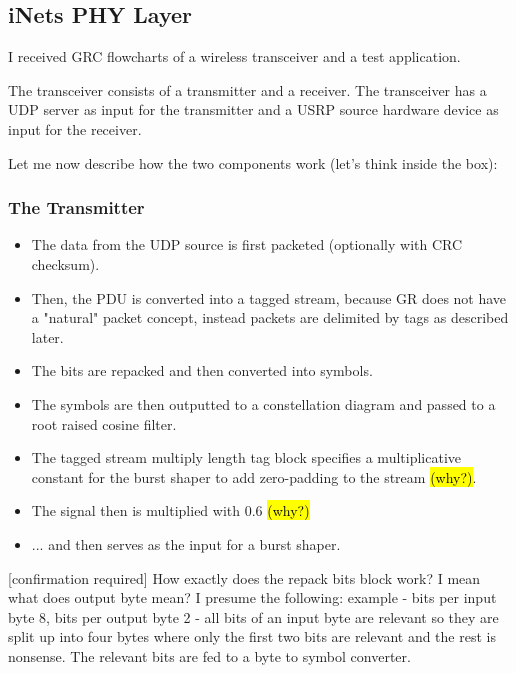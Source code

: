 \documentclass{article}
\begin{document}
\subsection{iNets PHY Layer}

I received GRC flowcharts of a wireless transceiver and a test application.

\bigskip

The transceiver consists of a transmitter and a receiver. The transceiver has a UDP server as input for the transmitter and a USRP source hardware device as input for the receiver. 

\bigskip

Let me now describe how the two components work (let's think inside the box):

\subsubsection{The Transmitter}

\begin{itemize}
	\item The data from the UDP source is first packeted (optionally with CRC checksum).
	\item Then, the PDU is converted into a tagged stream, because GR does not have a "natural" packet concept, instead packets are delimited by tags as described later.
	\item The bits are repacked and then converted into symbols.
	\item The symbols are then outputted to a constellation diagram and passed to a root raised cosine filter.
	\item The tagged stream multiply length tag block specifies a multiplicative constant for the burst shaper to add zero-padding to the stream \hl{(why?)}.
	\item The signal then is multiplied with 0.6 \hl{(why?)}
	\item ... and then serves as the input for a burst shaper.
\end{itemize}

      

\bigskip

\color{blue}
[confirmation required] How exactly does the repack bits block work? I mean what does output byte mean? I presume the following: example - bits per input byte 8, bits per output byte 2 - all bits of an input byte are relevant so they are split up into four bytes where only the first two bits are relevant and the rest is nonsense. The relevant bits are fed to a byte to symbol converter.
\color{black}
\end{document}
